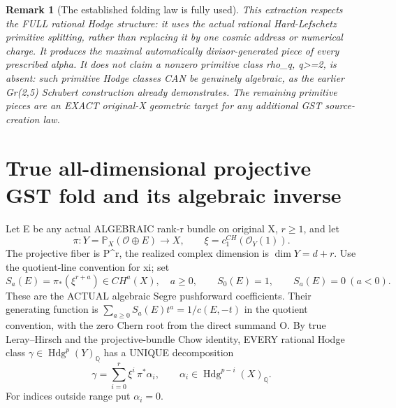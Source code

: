 \documentclass[11pt]{article}
\newtheorem{remark}[theorem]{Remark}
\begin{document}
\begin{remark}[The established folding law is fully used]
This extraction respects the FULL rational Hodge
structure: it uses the actual rational
Hard-Lefschetz primitive splitting,
rather than replacing it by one cosmic
address or numerical charge.
It produces the maximal automatically
divisor-generated piece of every prescribed
alpha. It does not claim a nonzero
primitive class rho_q, q>=2, is absent:
such primitive Hodge classes CAN be genuinely
algebraic, as the earlier Gr(2,5)
Schubert construction already demonstrates.
The remaining primitive pieces are an EXACT
original-X geometric target for any additional
GST source-creation law.
\end{remark}

\section{True all-dimensional projective GST fold and its algebraic inverse}
Let E be any actual ALGEBRAIC rank-r bundle on original X,
$r\ge1$, and let
\[
 \pi:Y=\mathbb P_X(\mathcal O\oplus E)\to X,
 \qquad \xi=c_1^{CH}(\mathcal O_Y(1)).
\]
The projective fiber is P^r, the realized
complex dimension is $\dim Y=d+r$.
Use the quotient-line convention for xi; set
\[
 S_a(E)=\pi_*(\xi^{r+a})\in CH^a(X),\quad a\ge0,
 \qquad S_0(E)=1,\qquad S_a(E)=0\ (a<0).
                                                               \tag{4}
\]
These are the ACTUAL algebraic Segre pushforward
coefficients. Their generating function is
$\sum_{a\ge0}S_a(E)t^a=1/c(E,-t)$
in the quotient convention, with the zero Chern
root from the direct summand O.
By true Leray--Hirsch and the projective-bundle
Chow identity, EVERY rational Hodge class
$\gamma\in\operatorname{Hdg}^p(Y)_{\mathbb Q}$
has a UNIQUE decomposition
\[
 \boxed{\gamma=\sum_{i=0}^r
       \xi^i\,\pi^*\alpha_i,\qquad
    \alpha_i\in\operatorname{Hdg}^{p-i}(X)_{\mathbb Q}.}
                                                               \tag{5}
\]
For indices outside range put $\alpha_i=0$.
\end{document}
